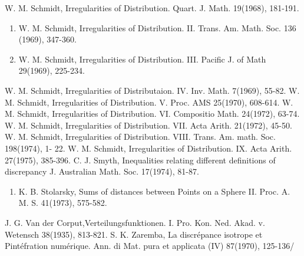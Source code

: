 \begin{thebibliography}{99}
 {W. M. Schmidt}, Irregularities of Distribution. Quart. J. Math. 19(1968), 181-191.\label{k21}
  \begin{enumerate}[a]
  \item {W. M. Schmidt}, Irregularities of Distribution. II. Trans. Am. 
    Math. Soc. 136 (1969), 347-360.\label{k21:e21a}
  \item {W. M. Schmidt}, Irregularities of Distribution. III. Pacific J. 
    of Math 29(1969), 225-234.\label{k21:e21b}
  \end{enumerate}
 {W. M. Schmidt}, Irregularities of Distributaion. IV. Inv. Math. 7(1969), 55-82.
 {W. M. Schmidt}, Irregularities of Distribution. V. Proc. AMS 25(1970), 608-614.
 {W. M. Schmidt}, Irregularities of Distribution. VI. Compositio Math. 24(1972), 63-74.
 {W. M. Schmidt}, Irregularities of Distribution. VII. Acta Arith. 21(1972), 45-50.
 {W. M. Schmidt}, Irregularities of Distribution. VIII. Trans. Am. math. Soc. 198(1974), 1- 22.
 {W. M. Schmidt}, Irregularities of Distribution. IX. Acta Arith. 27(1975), 385-396.
 {C. J. Smyth}, Inequalities relating different definitions of discrepancy J. Australian Math. Soc. 17(1974), 81-87.\label{k28}
  \begin{enumerate}[a]
  \item {K. B. Stolarsky}, Sums of distances between Points on a Sphere 
    II. Proc. A. M. S. 41(1973), 575-582.\label{k28:e28a}
  \end{enumerate}
 {J. G. Van der Corput},\pageoriginale Verteilungsfunktionen. I. Pro. Kon. Ned. Akad. v. Wetensch 38(1935), 813-821.
 {S. K. Zaremba}, La discr\'{e}pance isotrope et Pint\'{e}fration num\'{e}rique. Ann. di Mat. pura et applicata (IV) 87(1970), 125-136/
\end{thebibliography}
